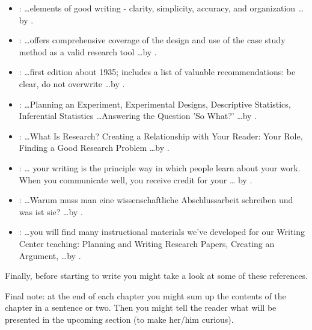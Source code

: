 \begin{itemize}
  \item \emph{}: \ldots elements of good writing - clarity, simplicity, accuracy, and organization \ldots by \cite{Zobel:2004}.
  
  \item \emph{}: \ldots offers comprehensive coverage of the design and use of the case study method as a valid research tool \ldots by \cite{Yin:2013}.

  \item \emph{}: \ldots first edition about 1935; includes a list of valuable recommendations: be clear, do not overwrite \ldots by \cite{Strunk:2000}.

  \item \emph{}: \ldots Planning an Experiment,	
Experimental Designs, Descriptive Statistics, Inferential Statistics \ldots Answering the Question 'So What?' \ldots by \cite{Field:2003}.

  \item \emph{}: \ldots What Is Research? Creating a Relationship with Your Reader: Your Role, Finding a Good Research Problem \ldots by \cite{Booth:2008}.

  \item \emph{}: 
  \ldots 
  your writing is the principle way in which people learn about your work.
  When you communicate well, you receive credit for your 
  \ldots 
  by \cite{Alley:1998}.

  \item \emph{}: \ldots Warum muss man eine wissenschaftliche Abschlussarbeit schreiben und was ist sie? \ldots by \cite{Eco:2010}.

  \item \emph{}: \ldots you will find many instructional materials we've developed for our Writing Center teaching: Planning and Writing Research Papers, Creating an Argument,  \ldots by \cite{Wisconsin:2004}.


\end{itemize}

Finally, before starting to write you might take a look at some of these references.

\vfill

Final note: at the end of each chapter you might sum up the contents of the chapter in a sentence or two. Then you might tell the reader what will be presented in the upcoming section (to make her/him curious).


\chapterend
